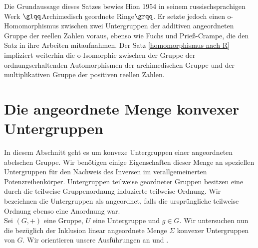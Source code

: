 Die Grundaussage dieses Satzes bewies Hion 1954 in seinem russischsprachigen Werk $\glqq$Archimedisch geordnete Ringe$\grqq$. Er setzte jedoch einen o-Homomorphismus zwischen zwei Untergruppen der additiven angeordneten Gruppe der reellen Zahlen voraus, ebenso wie Fuchs und Prieß-Crampe, die den Satz in ihre Arbeiten mitaufnahmen.  Der Satz \ref{homomorphismus nach R} impliziert weiterhin die o-Isomorphie zwischen der Gruppe der ordnungserhaltenden Automorphismen der archimedischen Gruppe und der multiplikativen Gruppe der positiven reellen Zahlen. \cite{priesscrampe83}
%
%
%
%
%
\section{Die angeordnete Menge konvexer Untergruppen}
In diesem Abschnitt geht es um konvexe Untergruppen einer angeordneten abelschen Gruppe. Wir benötigen einige Eigenschaften dieser Menge an speziellen Untergruppen für den Nachweis des Inversen im verallgemeinerten Potenzreihenkörper. Untergruppen teilweise geordneter Gruppen besitzen eine durch die teilweise Gruppenordnung induzierte teilweise Ordnung. Wir bezeichnen die Untergruppen als angeordnet, falls die ursprüngliche teilweise Ordnung ebenso eine Anordnung war.\\
Sei $\left(G, +\right)$ eine Gruppe, $U$ eine Untergruppe und $g \in G$. 
Wir untersuchen nun die bezüglich der Inklusion linear angeordnete Menge $\Sigma$ konvexer Untergruppen von $G$. Wir orientieren unsere Ausführungen an \cite[S. 81 - 83]{fuchs66}  und \cite[S. 3]{priesscrampe83}.

